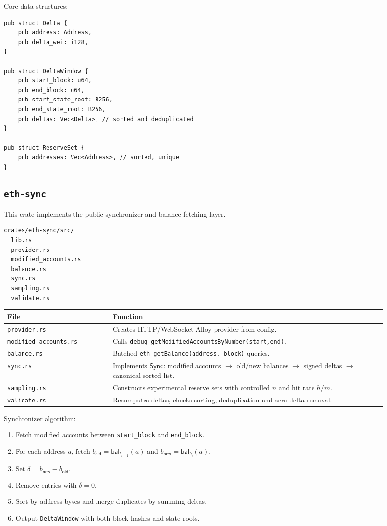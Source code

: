 \documentclass[UTF8,a4paper,11pt]{ctexart}
\newcommand{\Sync}{\mathsf{Sync}}
\newcommand{\bal}{\mathsf{bal}}
\begin{document}
Core data structures:
\begin{lstlisting}
pub struct Delta {
    pub address: Address,
    pub delta_wei: i128,
}

pub struct DeltaWindow {
    pub start_block: u64,
    pub end_block: u64,
    pub start_state_root: B256,
    pub end_state_root: B256,
    pub deltas: Vec<Delta>, // sorted and deduplicated
}

pub struct ReserveSet {
    pub addresses: Vec<Address>, // sorted, unique
}
\end{lstlisting}

\subsection{\texttt{eth-sync}}

This crate implements the public synchronizer and balance-fetching layer.

\begin{lstlisting}
crates/eth-sync/src/
  lib.rs
  provider.rs
  modified_accounts.rs
  balance.rs
  sync.rs
  sampling.rs
  validate.rs
\end{lstlisting}

\begin{longtable}{p{0.25\linewidth}p{0.65\linewidth}}
\toprule
File & Function \\
\midrule
\texttt{provider.rs} & Creates HTTP/WebSocket Alloy provider from config. \\
\texttt{modified\_accounts.rs} & Calls \texttt{debug\_getModifiedAccountsByNumber(start,end)}. \\
\texttt{balance.rs} & Batched \texttt{eth\_getBalance(address, block)} queries. \\
\texttt{sync.rs} & Implements $\Sync$: modified accounts $\to$ old/new balances $\to$ signed deltas $\to$ canonical sorted list. \\
\texttt{sampling.rs} & Constructs experimental reserve sets with controlled $n$ and hit rate $h/m$. \\
\texttt{validate.rs} & Recomputes deltas, checks sorting, deduplication and zero-delta removal. \\
\bottomrule
\end{longtable}

Synchronizer algorithm:
\begin{enumerate}[leftmargin=2em]
  \item Fetch modified accounts between \texttt{start\_block} and \texttt{end\_block}.
  \item For each address $a$, fetch $b_{\mathsf{old}}=\bal_{b_{i-1}}(a)$ and $b_{\mathsf{new}}=\bal_{b_i}(a)$.
  \item Set $\delta=b_{\mathsf{new}}-b_{\mathsf{old}}$.
  \item Remove entries with $\delta=0$.
  \item Sort by address bytes and merge duplicates by summing deltas.
  \item Output \texttt{DeltaWindow} with both block hashes and state roots.
\end{enumerate}
\end{document}

